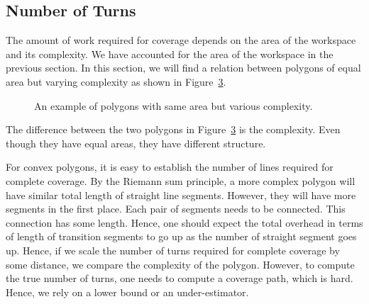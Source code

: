 \documentclass[../main.tex]{subfiles}
\begin{document}
\subsection{Number of Turns}

The amount of work required for coverage depends on the area of the workspace and its complexity. We have accounted for the area of the workspace in the previous section. In this section, we will find a relation between polygons of equal area but varying complexity as shown in Figure~\ref{fig:area_complexity}.

\begin{figure}
	\centering
	\begin{subfigure}{0.5\linewidth}
		\centering
		\caption{\label{fig:area_complexity_i}}
	\end{subfigure}%
	\begin{subfigure}{0.5\linewidth}
		\centering
		
		\caption{\label{fig:area_complexity_ii}}
	\end{subfigure}
	\caption{An example of polygons with same area but various complexity.}
	\label{fig:area_complexity}
\end{figure}

The difference between the two polygons in Figure~\ref{fig:area_complexity} is the complexity. Even though they have equal areas, they have different structure.

For convex polygons, it is easy to establish the number of lines required for complete coverage. By the Riemann sum principle, a more complex polygon will have similar total length of straight line segments. However, they will have more segments in the first place. Each pair of segments needs to be connected. This connection has some length. Hence, one should expect the total overhead in terms of length of transition segments to go up as the number of straight segment goes up. Hence, if we scale the number of turns required for complete coverage by some distance, we compare the complexity of the polygon. However, to compute the true number of turns, one needs to compute a coverage path, which is hard. Hence, we rely on a lower bound or an under-estimator.

\end{document}
